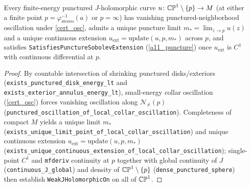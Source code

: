 \begin{theorem}
\label{cert_punc}
\leanok
{}
Every finite-energy punctured $J$-holomorphic curve $u\colon \mathbb{CP}^1\setminus\{p\}\to M$ (at either a
finite point $p=\varphi_{\mathrm{stereo}}^{-1}(a)$ or $p=\infty$) has vanishing punctured-neighborhood
oscillation under \cref{cert_osc}, admits a unique puncture limit $m_*=\lim_{z\to p}u(z)$ and a
unique continuous extension $u_{\mathrm{ext}}=\mathrm{update}(u,p,m_*)$ across $p$, and satisfies
\texttt{SatisfiesPunctureSobolevExtension} (\cref{a11_puncture}) once $u_{\mathrm{ext}}$ is $C^1$ with
continuous differential at $p$.
\end{theorem}
\begin{proof}\leanok By countable intersection of shrinking punctured disks/exteriors
(\texttt{exists\_punctured\_disk\_energy\_lt} and \texttt{exists\_exterior\_annulus\_energy\_lt}),
small-energy collar oscillation (\cref{cert_osc}) forces vanishing oscillation along $\mathcal{N}_{\ne}(p)$
(\texttt{punctured\_oscillation\_of\_local\_collar\_oscillation}). Completeness of compact $M$ yields
a unique limit $m_*$ (\texttt{exists\_unique\_limit\_point\_of\_local\_collar\_oscillation}) and unique
continuous extension $u_{\mathrm{ext}}=\mathrm{update}(u,p,m_*)$
(\texttt{exists\_unique\_continuous\_extension\_of\_local\_collar\_oscillation}); single-point $C^1$
and \texttt{mfderiv} continuity at $p$ together with global continuity of $J$ (\texttt{continuous\_J\_global})
and density of $\mathbb{CP}^1\setminus\{p\}$ (\texttt{dense\_punctured\_sphere}) then establish
\texttt{WeakJHolomorphicOn} on all of $\mathbb{CP}^1$.\end{proof}

